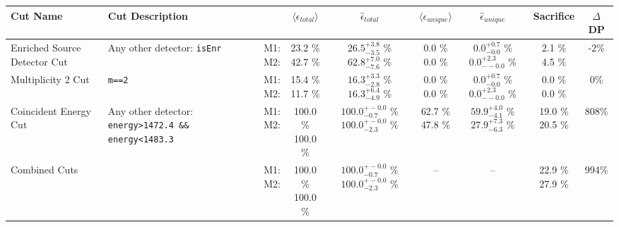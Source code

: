\small
\begin{tabular}{|>{\raggedright}m{3cm}|m{6cm}|c c c|c c|c|c|}
\hline
  Cut Name & Cut Description &   & $\langle\epsilon_{total}\rangle$ & $\hat{\epsilon}_{total}$ & $\langle\epsilon_{unique}\rangle$ & $\hat{\epsilon}_{unique}$ & Sacrifice & $\Delta$DP \\
\hline
  Enriched Source Detector Cut & \tiny Any other detector: \texttt{isEnr} & \makecell{M1: \\ M2:} & \makecell{23.2 \% \\ 42.7 \%} & \makecell{$26.5^{+3.8}_{-3.5}$ \% \\ $62.8^{+7.0}_{-7.6}$ \%} & \makecell{0.0 \% \\ 0.0 \%} & \makecell{$0.0^{+0.7}_{-0.0}$ \% \\ $0.0^{+2.3}_{--0.0}$ \%} & \makecell{2.1 \% \\ 4.5 \%} & -2\% \\
  Multiplicity 2 Cut & \tiny  \texttt{m==2} & \makecell{M1: \\ M2:} & \makecell{15.4 \% \\ 11.7 \%} & \makecell{$16.3^{+3.3}_{-2.8}$ \% \\ $16.3^{+6.4}_{-4.9}$ \%} & \makecell{0.0 \% \\ 0.0 \%} & \makecell{$0.0^{+0.7}_{-0.0}$ \% \\ $0.0^{+2.3}_{--0.0}$ \%} & \makecell{0.0 \% \\ 0.0 \%} & 0\% \\
  Coincident Energy Cut & \tiny Any other detector: \texttt{energy>1472.4 \&\& energy<1483.3} & \makecell{M1: \\ M2:} & \makecell{100.0 \% \\ 100.0 \%} & \makecell{$100.0^{+-0.0}_{-0.7}$ \% \\ $100.0^{+-0.0}_{-2.3}$ \%} & \makecell{62.7 \% \\ 47.8 \%} & \makecell{$59.9^{+4.0}_{-4.1}$ \% \\ $27.9^{+7.3}_{-6.3}$ \%} & \makecell{19.0 \% \\ 20.5 \%} & 808\% \\
  Combined Cuts &  & \makecell{M1: \\ M2:} & \makecell{100.0 \% \\ 100.0 \%} & \makecell{$100.0^{+-0.0}_{-0.7}$ \% \\ $100.0^{+-0.0}_{-2.3}$ \%} & -- & -- & \makecell{22.9 \% \\ 27.9 \%} & 994\% \\
\hline
\end{tabular}
